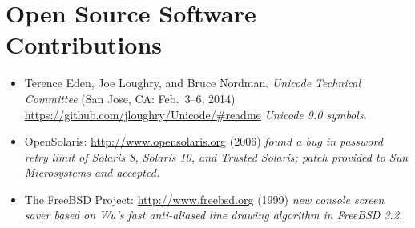 \section*{Open Source Software Contributions}
\vspace{-3mm}

\begin{itemize}
	\item Terence Eden, Joe Loughry, and Bruce Nordman. \emph{Unicode
		Technical Committee} (San Jose, CA: Feb.\ 3--6, 2014)
		\url{https://github.com/jloughry/Unicode/#readme}
    \emph{Unicode 9.0 symbols.}\vspace{-2.5mm}
	\item OpenSolaris: \url{http://www.opensolaris.org} (2006)
		\emph{found a bug in password retry limit of Solaris 8, Solaris 10,
		and Trusted Solaris; patch provided to Sun Microsystems and
    accepted.}\vspace{-2.5mm}
	\item The FreeBSD Project: \url{http://www.freebsd.org} (1999)
		\emph{new console screen saver based on Wu's fast
		anti-aliased line drawing algorithm in FreeBSD 3.2.}\vspace{-2.5mm}
\end{itemize}

